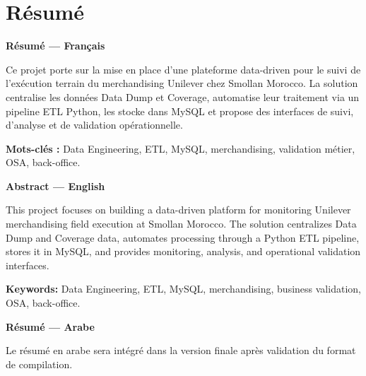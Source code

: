 \chapter*{Résumé}

\textbf{Résumé --- Français}

Ce projet porte sur la mise en place d'une plateforme data-driven pour le suivi de l'exécution terrain du merchandising Unilever chez Smollan Morocco. La solution centralise les données Data Dump et Coverage, automatise leur traitement via un pipeline ETL Python, les stocke dans MySQL et propose des interfaces de suivi, d'analyse et de validation opérationnelle.

\textbf{Mots-clés :} Data Engineering, ETL, MySQL, merchandising, validation métier, OSA, back-office.

\vspace{0.5cm}

\textbf{Abstract --- English}

This project focuses on building a data-driven platform for monitoring Unilever merchandising field execution at Smollan Morocco. The solution centralizes Data Dump and Coverage data, automates processing through a Python ETL pipeline, stores it in MySQL, and provides monitoring, analysis, and operational validation interfaces.

\textbf{Keywords:} Data Engineering, ETL, MySQL, merchandising, business validation, OSA, back-office.

\vspace{0.5cm}

\textbf{Résumé --- Arabe}

Le résumé en arabe sera intégré dans la version finale après validation du format de compilation.